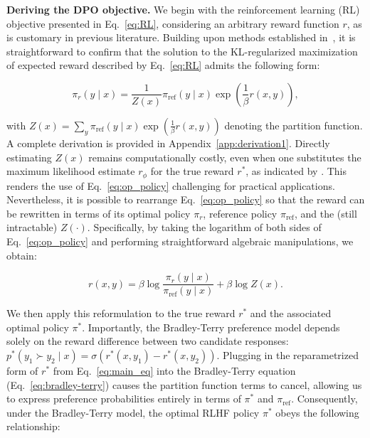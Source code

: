 \textbf{Deriving the DPO objective.} We begin with the reinforcement learning (RL) objective presented in Eq.~\ref{eq:RL}, considering an arbitrary reward function $r$, as is customary in previous literature. Building upon methods established in~\citep{peters2007reinforcement, peng2019advantage, korbak2022reinforcement, go2023aligning}, it is straightforward to confirm that the solution to the KL-regularized maximization of expected reward described by Eq.~\ref{eq:RL} admits the following form:

\begin{equation}\label{eq:op_policy}
    \pi_r(y\mid x) = \frac{1}{Z(x)}\pi_\text{ref}(y\mid x)\exp\left(\frac{1}{\beta}r(x, y)\right),
\end{equation}

with $Z(x) =\sum_{y}\pi_\text{ref}(y\mid x)\exp\left(\frac{1}{\beta}r(x, y)\right)$ denoting the partition function. A complete derivation is provided in Appendix~\ref{app:derivation1}. Directly estimating $Z(x)$ remains computationally costly, even when one substitutes the maximum likelihood estimate $r_\phi$ for the true reward $r^*$, as indicated by \citep{korbak2022reinforcement, go2023aligning}. This renders the use of Eq.~\ref{eq:op_policy} challenging for practical applications. Nevertheless, it is possible to rearrange Eq.~\ref{eq:op_policy} so that the reward can be rewritten in terms of its optimal policy $\pi_r$, reference policy $\pi_\text{ref}$, and the (still intractable) $Z(\cdot)$. Specifically, by taking the logarithm of both sides of Eq.~\ref{eq:op_policy} and performing straightforward algebraic manipulations, we obtain:

\begin{equation}\label{eq:main_eq}
    r(x,y) =\beta \log \frac{\pi_r(y\mid x)}{\pi_\text{ref}(y\mid x)} + \beta \log Z(x).
\end{equation}

We then apply this reformulation to the true reward $r^*$ and the associated optimal policy $\pi^*$. Importantly, the Bradley-Terry preference model depends solely on the reward difference between two candidate responses: ${p^*(y_1 \succ y_2 \mid x) = \sigma(r^*(x, y_1) - r^*(x, y_2))}$. Plugging in the reparametrized form of $r^*$ from Eq.~\ref{eq:main_eq} into the Bradley-Terry equation (Eq.~\ref{eq:bradley-terry}) causes the partition function terms to cancel, allowing us to express preference probabilities entirely in terms of $\pi^*$ and $\pi_\text{ref}$. Consequently, under the Bradley-Terry model, the optimal RLHF policy $\pi^*$ obeys the following relationship:

